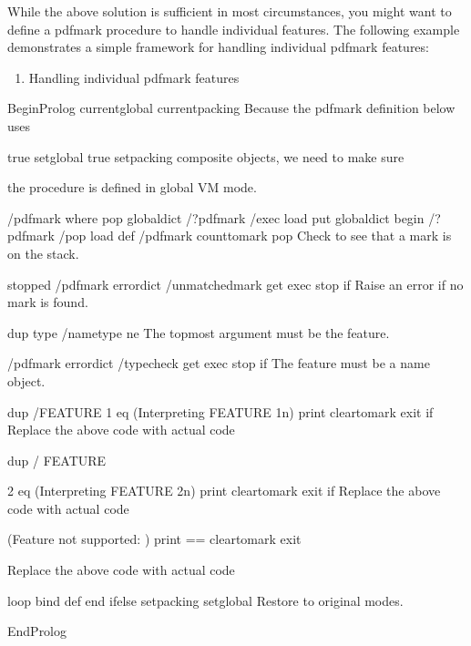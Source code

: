 \documentclass[letterpaper,12pt,english,openany,oneside]{sphinxmanual}
\begin{document}
While the above solution is sufficient in most circumstances, you might want to define a pdfmark procedure to handle individual features. The following example demonstrates a simple framework for handling individual pdfmark features:
\begin{enumerate}
%
\item {} 
Handling individual pdfmark features

\end{enumerate}

\begin{sphinxVerbatim}[commandchars=\\\{\}]
 \PYGZpc{}\PYGZpc{}BeginProlog
  currentglobal currentpacking
\PYGZpc{} Because the pdfmark definition below uses

  true setglobal true setpacking
\PYGZpc{} composite objects, we need to make sure


\PYGZpc{} the procedure is defined in global VM mode.

  /pdfmark where
      \PYGZob{} pop globaldict /?pdfmark /exec load put\PYGZcb{}
      \PYGZob{}
      globaldict
          begin
          /?pdfmark /pop load def
          /pdfmark
              \PYGZob{}
                  \PYGZob{} counttomark pop \PYGZcb{}
\PYGZpc{} Check to see that a mark is on the stack.

              stopped
                  \PYGZob{} /pdfmark errordict /unmatchedmark get exec stop \PYGZcb{}
              if
\PYGZpc{} Raise an error if no mark is found.

              dup type /nametype ne
\PYGZpc{} The topmost argument must be the feature.

                  \PYGZob{} /pdfmark errordict /typecheck get exec stop \PYGZcb{}
              if
\PYGZpc{} The feature must be a name object.

                  \PYGZob{}
                  dup /FEATURE
1
 eq
                      \PYGZob{} (Interpreting FEATURE 1n) print cleartomark exit \PYGZcb{}
                  if
\PYGZpc{} Replace the above code with actual code

                  dup /
FEATURE

2
 eq
                      \PYGZob{} (Interpreting FEATURE 2n) print cleartomark exit \PYGZcb{}
                  if
\PYGZpc{} Replace the above code with actual code

                  (Feature not supported: ) print == cleartomark exit

\PYGZpc{} Replace the above code with actual code

                  \PYGZcb{}
              loop
              \PYGZcb{} bind def
          end
      \PYGZcb{}
  ifelse
  setpacking setglobal
\PYGZpc{} Restore to original modes.

  \PYGZpc{}\PYGZpc{}EndProlog
\end{sphinxVerbatim}
\end{document}
